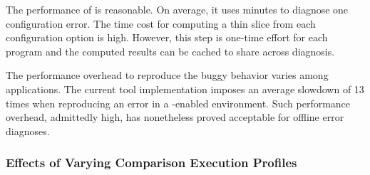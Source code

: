 The performance of \ourtool is reasonable.
On average, it uses \avgtime minutes to
diagnose one configuration error. The time cost for
computing a thin slice from each configuration option
is high. However, this step is one-time effort
for each program and the computed results can be cached
to share across diagnosis. %

The performance overhead to reproduce the buggy behavior varies
among applications. The current tool implementation
imposes an average slowdown of 13 times when reproducing
an error in a \ourtool-enabled environment.
Such performance overhead, admittedly high, has nonetheless proved acceptable
for offline error diagnoses.






\subsubsection{Effects of Varying Comparison Execution Profiles}
\label{sec:ranking}


